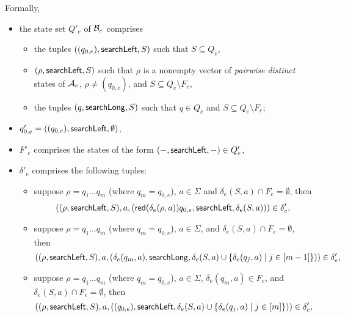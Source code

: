 %
Formally, 
\begin{itemize}
	\item the state set $Q'_e$ of $\mathcal{B}_e$ comprises 
	\begin{itemize}
		\item the tuples $((q_{0,e}), \mathsf{searchLeft}, S)$ such that $S \subseteq Q_e$,
		\item $(\rho, \mathsf{searchLeft}, S)$ such that  $\rho$ is a nonempty vector of \emph{pairwise distinct} states of $\mathcal{A}_e$, $\rho \neq (q_{0,e})$, and $S \subseteq Q_e \setminus F_e$, 
		\item the tuples $(q, \mathsf{searchLong}, S)$ such that $q \in Q_e$ and $S \subseteq Q_e \setminus F_e$;
	\end{itemize}
	\item $q'_{0,e}= ((q_{0,e}), \mathsf{searchLeft}, \emptyset)$,
	\item $F'_{e}$ comprises the states of the form $(-, \mathsf{searchLeft}, -) \in Q'_e$,
	\item $\delta'_e$ comprises the following tuples: 
	\begin{itemize}
		\item suppose $\rho = q_1 \dots q_m$ (where $q_m = q_{0,e}$),  $a \in \Sigma$ and $\delta_e(S,a) \cap F_e = \emptyset$, then 
		$$((\rho, \mathsf{searchLeft}, S), a, (\mathsf{red}(\delta_e(\rho,a))q_{0,e}, \mathsf{searchLeft}, \delta_e(S,a))) \in \delta'_e,$$ 
		\item suppose $\rho = q_1 \dots q_m$ (where $q_m = q_{0,e}$),  $a \in \Sigma$, and $\delta_e(S,a) \cap F_e = \emptyset$, then 
		$$((\rho, \mathsf{searchLeft}, S), a, (\delta_e(q_m, a), \mathsf{searchLong}, \delta_e(S,a) \cup \{\delta_e(q_j, a) \mid j \in [m-1]\})) \in \delta'_e,$$ 
		\item suppose $\rho = q_1 \dots q_m$ (where $q_m = q_{0,e}$),  $a \in \Sigma$, $\delta_e(q_m, a) \in F_e$, and $\delta_e(S,a) \cap F_e = \emptyset$, then 
		$$((\rho, \mathsf{searchLeft}, S), a, ((q_{0,e}), \mathsf{searchLeft}, \delta_e(S,a) \cup \{\delta_e(q_j, a) \mid j \in [m]\})) \in \delta'_e,$$ 
\end{itemize}
\end{itemize}
